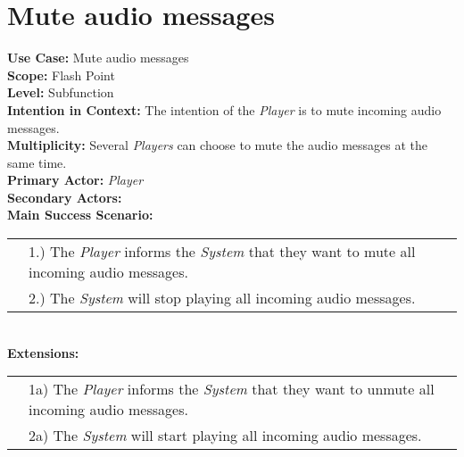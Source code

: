 \documentclass{article}
\begin{document}
	\section*{Mute audio messages}
	\textbf{Use Case:} Mute audio messages\\
	\textbf{Scope:} Flash Point\\
	\textbf{Level:} Subfunction\\
	\textbf{Intention in Context: } The intention of the \textit{Player} is to mute incoming audio messages.\\
	\textbf{Multiplicity: } Several \textit{Players} can choose to mute the audio messages at the same time.\\
	\textbf{Primary Actor:} \textit{Player} \\
	\textbf{Secondary Actors:}\\
	\textbf{Main Success Scenario:}\\
	\begin{tabular}{l l}
		&1.) The \textit{Player} informs the \textit{System} that they want to mute all incoming audio messages.\\
		&2.) The \textit{System} will stop playing all incoming audio messages.
	\end{tabular}\\
	\textbf{Extensions: }\\
	\begin{tabular}{l l}
		&1a) The \textit{Player} informs the \textit{System} that they want to unmute all incoming audio messages.\\
		&2a) The \textit{System} will start playing all incoming audio messages.
	\end{tabular}
\end{document}
